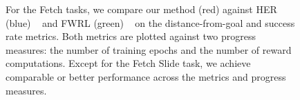 \begin{figure}
{\begin{minipage}[t]{0.55\linewidth}
\end{minipage}%
}
\caption{For the Fetch tasks, we compare our method (red) against HER (blue) ~\citep{andrychowicz2016learning}
  and FWRL (green) ~\citep{kaelbling1993learning} on the distance-from-goal
  and success rate metrics. Both metrics are plotted
  against two progress measures: the number of training epochs and the number of reward
  computations. Except for the Fetch Slide task, we achieve comparable or
  better performance across the metrics and progress measures. 
}%
\label{fig:fetch-results}%
\end{figure}
